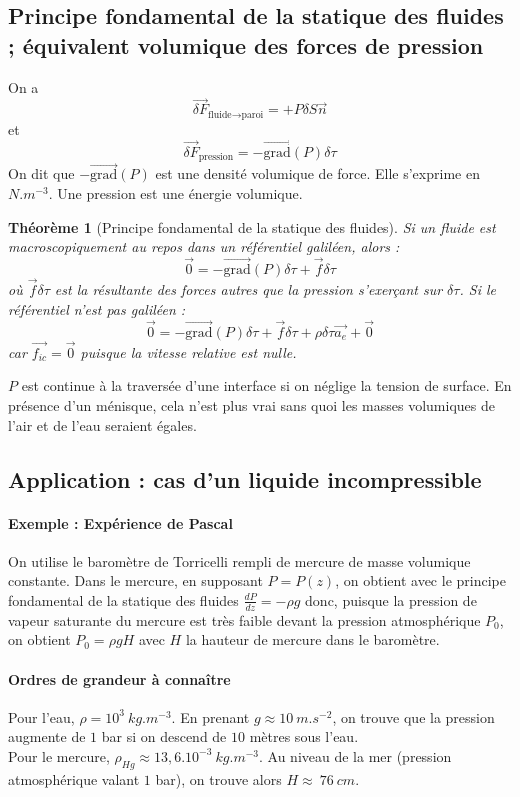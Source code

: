 \documentclass[french]{book}
\theoremstyle{plain}
\newtheorem{thm}{Théorème}
\theoremstyle{definition}
\theoremstyle{remark}
\newcommand{\grad}{\overrightarrow{\text{grad}}}
\begin{document}
\subsection{Principe fondamental de la statique des fluides ; équivalent volumique des forces de pression}
On a $$\overrightarrow{\delta F}_{\text{fluide}\to\text{paroi}}=+P\delta S\overrightarrow{n}$$ et $$\overrightarrow{\delta F}_{\text{pression}}=-\grad(P)\delta \tau$$ On dit que $-\grad(P)$ est une densité volumique de force. Elle s'exprime en $N.m^{-3}$. Une pression est une énergie volumique.
\begin{thm}[Principe fondamental de la statique des fluides]
	Si un fluide est macroscopiquement au repos dans un référentiel galiléen, alors : $$\overrightarrow{0}=-\grad(P)\delta\tau+\overrightarrow{f}\delta\tau$$ où $\overrightarrow{f}\delta\tau$ est la résultante des forces autres que la pression s'exerçant sur $\delta\tau$. Si le référentiel n'est pas galiléen : $$\overrightarrow{0}=-\grad(P)\delta\tau+\overrightarrow{f}\delta\tau+\rho\delta\tau\overrightarrow{a_e}+\overrightarrow{0}$$ car $\overrightarrow{f_{ic}}=\overrightarrow{0}$ puisque la vitesse relative est nulle.
\end{thm}
$P$ est continue à la traversée d'une interface si on néglige la tension de surface. En présence d'un ménisque, cela n'est plus vrai sans quoi les masses volumiques de l'air et de l'eau seraient égales.
\subsection{Application : cas d'un liquide incompressible}
\paragraph{Exemple : Expérience de Pascal} On utilise le baromètre de Torricelli rempli de mercure de masse volumique constante. Dans le mercure, en supposant $P=P(z)$, on obtient avec le principe fondamental de la statique des fluides $\displaystyle\frac{dP}{dz}=-\rho g$ donc, puisque la pression de vapeur saturante du mercure est très faible devant la pression atmosphérique $P_0$, on obtient $P_0=\rho g H$ avec $H$ la hauteur de mercure dans le baromètre.
\paragraph{Ordres de grandeur à connaître} Pour l'eau, $\rho =10^3 \ kg.m^{-3}$. En prenant $g\approx 10\ m.s^{-2}$, on trouve que la pression augmente de $1$ bar si on descend de $10$ mètres sous l'eau. \\ Pour le mercure, $\rho_{Hg}\approx 13,6.10^{-3}\ kg.m^{-3}$. Au niveau de la mer (pression atmosphérique valant $1$ bar), on trouve alors $H\approx \ 76\ cm$.
\end{document}
